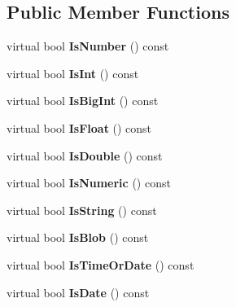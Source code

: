 \subsection*{Public Member Functions}
\begin{DoxyCompactItemize}
\item 
\mbox{\label{class_i_s_q_l_data_a9be1248042f54bbd29f8ff80861f1184}} 
virtual bool {\bfseries Is\+Number} () const
\item 
\mbox{\label{class_i_s_q_l_data_a58a4af11cf71a2abdea963de4c1860e0}} 
virtual bool {\bfseries Is\+Int} () const
\item 
\mbox{\label{class_i_s_q_l_data_ac0f8f32507adf196df6d58246a6b54cf}} 
virtual bool {\bfseries Is\+Big\+Int} () const
\item 
\mbox{\label{class_i_s_q_l_data_a8916b6115115b64de012d348cd320ffb}} 
virtual bool {\bfseries Is\+Float} () const
\item 
\mbox{\label{class_i_s_q_l_data_a646affad2c4d9659fafa5fa1e5cf8c71}} 
virtual bool {\bfseries Is\+Double} () const
\item 
\mbox{\label{class_i_s_q_l_data_af3d9007e9e16eb67824f687c0bd6bf51}} 
virtual bool {\bfseries Is\+Numeric} () const
\item 
\mbox{\label{class_i_s_q_l_data_a67b5d450d5adee75e6f0477ed539affb}} 
virtual bool {\bfseries Is\+String} () const
\item 
\mbox{\label{class_i_s_q_l_data_a6de7cafc8a0ec71a60ab5517e7162380}} 
virtual bool {\bfseries Is\+Blob} () const
\item 
\mbox{\label{class_i_s_q_l_data_a7decab88fd14fb80afa222f655f602cf}} 
virtual bool {\bfseries Is\+Time\+Or\+Date} () const
\item 
\mbox{\label{class_i_s_q_l_data_a7ec5c412e3d439ad432452e7b0104b00}} 
virtual bool {\bfseries Is\+Date} () const
\item 
\mbox{\label{class_i_s_q_l_data_a75108c3824ab3b77712df9607e938d74}} 

\end{DoxyCompactItemize}
